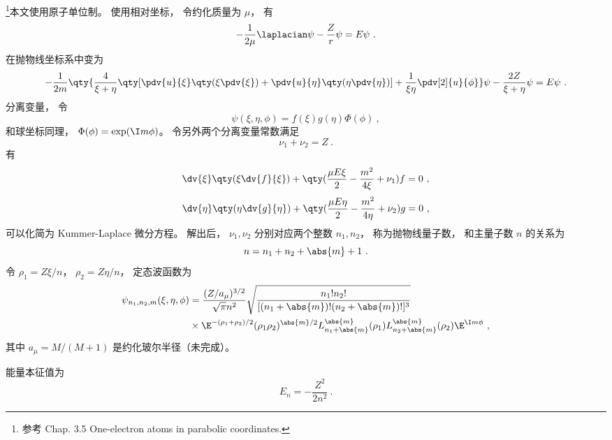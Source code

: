 
\begin{issues}
\issueDraft
{}
\end{issues}


\footnote{参考 \cite{Bransden} Chap. 3.5 One-electron atoms in parabolic coordinates.}本文使用原子单位制。 使用相对坐标， 令约化质量为 $\mu$， 有
\begin{equation}
-\frac{1}{2\mu} \laplacian \psi - \frac{Z}{r} \psi = E\psi~.
\end{equation}
在抛物线坐标系中变为
\begin{equation}
-\frac{1}{2m} \qty{\frac{4}{\xi + \eta} \qty[\pdv{u}{\xi}\qty(\xi\pdv{\xi}) + \pdv{u}{\eta}\qty(\eta\pdv{\eta})] + \frac{1}{\xi\eta}\pdv[2]{u}{\phi}}\psi - \frac{2Z}{\xi + \eta}\psi = E\psi~.
\end{equation}
分离变量， 令
\begin{equation}
\psi(\xi, \eta, \phi) = f(\xi) g(\eta) \Phi(\phi)~,
\end{equation}
和球坐标同理， $\Phi(\phi) = \exp(\I m \phi)$。 令另外两个分离变量常数满足
\begin{equation}
\nu_1 + \nu_2 = Z~.
\end{equation}
有
\begin{equation}\label{eq_ParaHy_1}
\dv{\xi} \qty(\xi \dv{f}{\xi}) + \qty(\frac{\mu E \xi}{2} - \frac{m^2}{4\xi} + \nu_1) f = 0~,
\end{equation}
\begin{equation}
\dv{\eta}\qty(\eta \dv{g}{\eta}) + \qty(\frac{\mu E\eta}{2} - \frac{m^2}{4\eta} + \nu_2)g = 0~,
\end{equation}
可以化简为 Kummer-Laplace 微分方程。 解出后， $\nu_1, \nu_2$ 分别对应两个整数 $n_1, n_2$， 称为抛物线量子数， 和主量子数 $n$ 的关系为
\begin{equation}
n = n_1 + n_2 + \abs{m} + 1~.
\end{equation}
令 $\rho_1 = Z\xi / n$， $\rho_2 = Z\eta/n$， 定态波函数为
\begin{equation}\label{eq_ParaHy_2}
\begin{aligned}
\psi_{n_1,n_2,m}(\xi,\eta,\phi) &= \frac{(Z/a_\mu)^{3/2}}{\sqrt{\pi} n^2} \sqrt{\frac{n_1!n_2!}{[(n_1+\abs{m})!(n_2+\abs{m})!]^3}} \\
&\times \E^{-(\rho_1+\rho_2)/2}(\rho_1\rho_2)^{\abs{m}/2} L_{n_1 + \abs{m}}^{\abs{m}}(\rho_1) L_{n_2 + \abs{m}}^{\abs{m}}(\rho_2) \E^{\I m\phi}~,
\end{aligned}
\end{equation}
其中 $a_\mu = M/(M + 1)$ 是约化玻尔半径（未完成）。

能量本征值为
\begin{equation}
E_n = -\frac{Z^2}{2n^2}~.
\end{equation}
